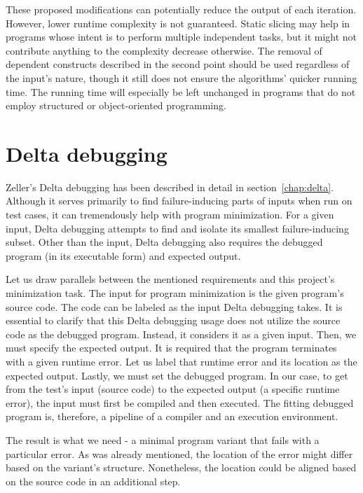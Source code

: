 These proposed modifications can potentially reduce the output of each 
iteration.
However, lower runtime complexity is not guaranteed.
Static slicing may help in programs whose intent is to perform multiple 
independent tasks, but it might not contribute anything to the complexity 
decrease otherwise.
The removal of dependent constructs described in the second point should be 
used regardless of the input's nature, though it still does not ensure 
the algorithms' quicker running time.
The running time will especially be left unchanged in programs that do not 
employ structured or object-oriented programming.

\section{Delta debugging}

Zeller's Delta debugging \cite{Zeller99, Zeller02, Zeller01} has been 
described in detail in section~\ref{chap:delta}.
Although it serves primarily to find failure-inducing parts of inputs when 
run on test cases, it can tremendously help with program minimization.
For a given input, Delta debugging attempts to find and isolate its 
smallest failure-inducing subset.
Other than the input, Delta debugging also requires the debugged program 
(in its executable form) and expected output.

Let us draw parallels between the mentioned requirements and this project's 
minimization task.
The input for program minimization is the given program's source code.
The code can be labeled as the input Delta debugging takes.
It is essential to clarify that this Delta debugging usage does not utilize 
the source code as the debugged program.
Instead, it considers it as a given input.
Then, we must specify the expected output.
It is required that the program terminates with a given runtime error.
Let us label that runtime error and its location as the expected output.
Lastly, we must set the debugged program.
In our case, to get from the test's input (source code) to the expected 
output (a specific runtime error), the input must first be compiled 
and then executed.
The fitting debugged program is, therefore, a pipeline of a compiler and 
an execution environment.

The result is what we need - a minimal program variant that fails with 
a particular error.
As was already mentioned, the location of the error might differ based 
on the variant's structure.
Nonetheless, the location could be aligned based on the source code in 
an additional step.


